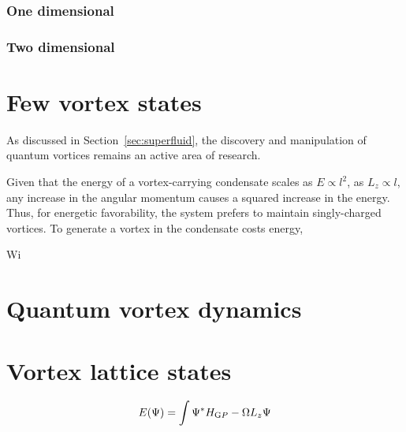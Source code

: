 {\subsubsection{One dimensional}

\subsubsection{Two dimensional}



\section{Few vortex states}
As discussed in Section~\ref{sec:superfluid}, the discovery and manipulation of quantum vortices remains an active area of research.


Given that the energy of a vortex-carrying condensate scales as $E\propto l^2$, as $L_z \propto l$, any increase in the angular momentum causes a squared increase in the energy. Thus, for energetic favorability, the system prefers to maintain singly-charged vortices. To generate a vortex in the condensate costs energy,

Wi

\section{Quantum vortex dynamics}



\section{Vortex lattice states}
    \begin{equation}
        E(\Psi) = \int \Psi^{*} H_{\text GP} -\Omega L_z \Psi
    \end{equation}





}
